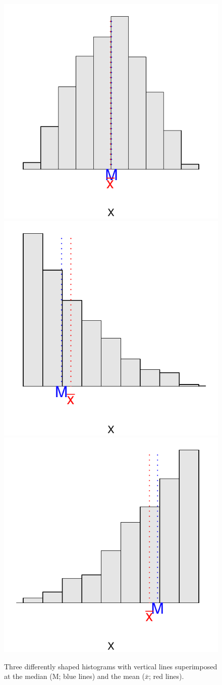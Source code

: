 \documentclass[10pt,openany]{book}\usepackage[]{graphicx}\usepackage[]{color}
\newenvironment{knitrout}{}{} %
\begin{document}
\begin{knitrout}
\color{fgcolor}\begin{figure}[hbtp]

{\centering \includegraphics[width=.3\linewidth]{Figs/MeanMedianShape-1} 
\includegraphics[width=.3\linewidth]{Figs/MeanMedianShape-2} 
\includegraphics[width=.3\linewidth]{Figs/MeanMedianShape-3} 

}

\caption[Three differently shaped histograms with vertical lines superimposed at the median (M]{Three differently shaped histograms with vertical lines superimposed at the median (M; blue lines) and the mean ($\bar{x}$; red lines).}\label{fig:MeanMedianShape}
\end{figure}


\end{knitrout}


\vspace{-12pt}
\end{document}
